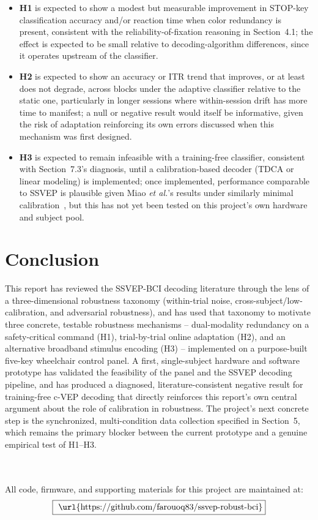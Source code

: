 \documentclass[11pt]{article}
\begin{document}
\begin{itemize}
  \item \textbf{H1} is expected to show a modest but measurable improvement in STOP-key classification accuracy and/or reaction time when color redundancy is present, consistent with the reliability-of-fixation reasoning in Section~4.1; the effect is expected to be small relative to decoding-algorithm differences, since it operates upstream of the classifier.
  \item \textbf{H2} is expected to show an accuracy or ITR trend that improves, or at least does not degrade, across blocks under the adaptive classifier relative to the static one, particularly in longer sessions where within-session drift has more time to manifest; a null or negative result would itself be informative, given the risk of adaptation reinforcing its own errors discussed when this mechanism was first designed.
  \item \textbf{H3} is expected to remain infeasible with a training-free classifier, consistent with Section~7.3's diagnosis, until a calibration-based decoder (TDCA or linear modeling) is implemented; once implemented, performance comparable to SSVEP is plausible given Miao \textit{et al.}'s results under similarly minimal calibration~\cite{miao2024cvepminimal}, but this has not yet been tested on this project's own hardware and subject pool.
\end{itemize}


\section{Conclusion}

This report has reviewed the SSVEP-BCI decoding literature through the lens of a three-dimensional robustness taxonomy (within-trial noise, cross-subject/low-calibration, and adversarial robustness), and has used that taxonomy to motivate three concrete, testable robustness mechanisms -- dual-modality redundancy on a safety-critical command (H1), trial-by-trial online adaptation (H2), and an alternative broadband stimulus encoding (H3) -- implemented on a purpose-built five-key wheelchair control panel. A first, single-subject hardware and software prototype has validated the feasibility of the panel and the SSVEP decoding pipeline, and has produced a diagnosed, literature-consistent negative result for training-free c-VEP decoding that directly reinforces this report's own central argument about the role of calibration in robustness. The project's next concrete step is the synchronized, multi-condition data collection specified in Section~5, which remains the primary blocker between the current prototype and a genuine empirical test of H1--H3.



\\
\\
All code, firmware, and supporting materials for this project are maintained at:\\
$$\boxed{
\text{
\url{https://github.com/farouoq83/ssvep-robust-bci}}}
$$


\end{document}

